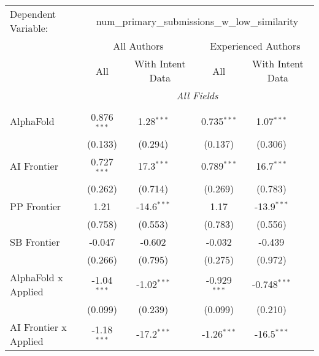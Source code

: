 \begingroup
\centering
\begin{tabular}{lcccccc}
   \tabularnewline \midrule \midrule
   Dependent Variable: & \multicolumn{6}{c}{num\_primary\_submissions\_w\_low\_similarity}\\
 & \multicolumn{3}{c}{All Authors} & \multicolumn{3}{c}{Experienced Authors} \\
\cmidrule(lr){2-4} \cmidrule(lr){5-7}
 & \multicolumn{1}{c}{All} & \multicolumn{2}{c}{With Intent Data} & \multicolumn{1}{c}{All} & \multicolumn{2}{c}{With Intent Data} \\
\cmidrule(lr){2-2} \cmidrule(lr){3-4} \cmidrule(lr){5-5} \cmidrule(lr){6-7}
 & \multicolumn{6}{c}{\textit{All Fields}} \\ \\
   AlphaFold                      & 0.876$^{***}$ & 1.28$^{***}$  &                & 0.735$^{***}$  & 1.07$^{***}$   &   \\   
                                  & (0.133)       & (0.294)       &                & (0.137)        & (0.306)        &   \\   
   AI Frontier                    & 0.727$^{***}$ & 17.3$^{***}$  &                & 0.789$^{***}$  & 16.7$^{***}$   &   \\   
                                  & (0.262)       & (0.714)       &                & (0.269)        & (0.783)        &   \\   
   PP Frontier                    & 1.21          & -14.6$^{***}$ &                & 1.17           & -13.9$^{***}$  &   \\   
                                  & (0.758)       & (0.553)       &                & (0.783)        & (0.556)        &   \\   
   SB Frontier                    & -0.047        & -0.602        &                & -0.032         & -0.439         &   \\   
                                  & (0.266)       & (0.795)       &                & (0.275)        & (0.972)        &   \\   
   AlphaFold x Applied            & -1.04$^{***}$ & -1.02$^{***}$ &                & -0.929$^{***}$ & -0.748$^{***}$ &   \\   
                                  & (0.099)       & (0.239)       &                & (0.099)        & (0.210)        &   \\   
   AI Frontier x Applied          & -1.18$^{***}$ & -17.2$^{***}$ &                & -1.26$^{***}$  & -16.5$^{***}$  &   \\   

\end{tabular}
